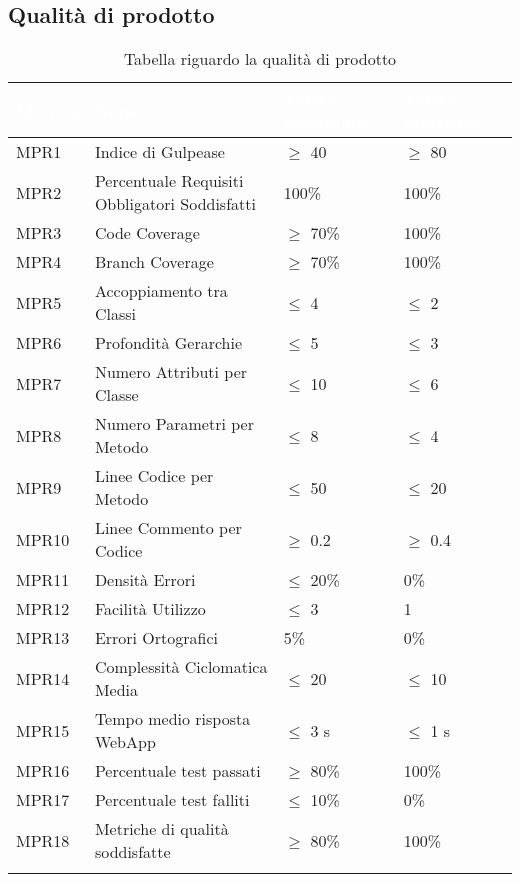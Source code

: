 \subsection{Qualità di prodotto}
{

    \setlength{\freewidth}{\dimexpr\textwidth-10\tabcolsep}
    \renewcommand{\arraystretch}{1.5}
    \centering
    \setlength{\aboverulesep}{0pt}
    \setlength{\belowrulesep}{0pt}
    \begin{longtable}{C{.257\freewidth} C{.257\freewidth} C{.257\freewidth} C{.257\freewidth}}
       \toprule
    \textcolor{white}{\textbf{Metrica}}&
    \textcolor{white}{\textbf{Nome}}&
    \textcolor{white}{\textbf{Valore accettabile}}&
    \textcolor{white}{\textbf{Valore preferibile}}\\	
    \toprule
    \endhead
    
    
    MPR1 & Indice di Gulpease & $\geq$ 40 & $\geq$ 80 \\
    MPR2 & Percentuale Requisiti Obbligatori Soddisfatti & 100\% & 100\% \\
    MPR3 & Code Coverage & $\geq$ 70\% & 100\% \\
    MPR4 & Branch Coverage & $\geq$ 70\% & 100\% \\
    MPR5 & Accoppiamento tra Classi & $\leq$ 4 & $\leq$ 2 \\
    MPR6 & Profondità Gerarchie & $\leq$ 5 & $\leq$ 3 \\
    MPR7 & Numero Attributi per Classe & $\leq$ 10 & $\leq$ 6 \\
    MPR8 & Numero Parametri per Metodo & $\leq$ 8 & $\leq$ 4 \\
    MPR9 & Linee Codice per Metodo & $\leq$ 50 & $\leq$ 20 \\
    MPR10 & Linee Commento per Codice & $\geq$ 0.2 & $\geq$ 0.4 \\
    MPR11 & Densità Errori & $\leq$ 20\% & 0\% \\
    MPR12 & Facilità Utilizzo  & $\leq$ 3 & 1 \\
    MPR13 & Errori Ortografici & 5\% & 0\% \\
    MPR14 & Complessità Ciclomatica Media & $\leq$ 20 & $\leq$ 10 \\
    MPR15 & Tempo medio risposta WebApp & $\leq$ 3 s & $\leq$ 1 s \\
    MPR16 & Percentuale test passati & $\geq$ 80\% & 100\% \\
    MPR17 & Percentuale test falliti & $\leq$ 10\% & 0\% \\
    MPR18 & Metriche di qualità soddisfatte & $\geq$ 80\% & 100\% \\	   
    \bottomrule
    \caption{Tabella riguardo la qualità di prodotto}
    \end{longtable}
}
